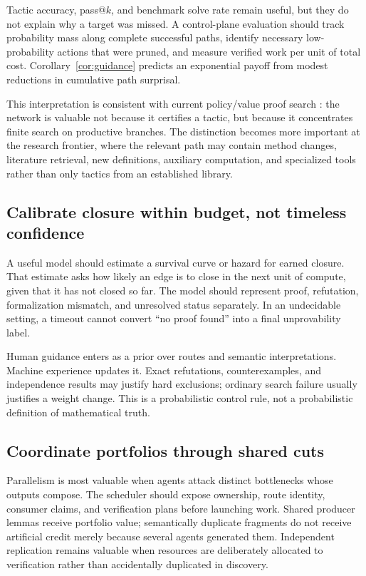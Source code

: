 \documentclass[11pt]{article}
\begin{document}
Tactic accuracy, pass@$k$, and benchmark solve rate remain useful, but they do
not explain why a target was missed.  A control-plane evaluation should track
probability mass along complete successful paths, identify necessary
low-probability actions that were pruned, and measure verified work per unit of
total cost.  Corollary~\ref{cor:guidance} predicts an exponential payoff from
modest reductions in cumulative path surprisal.

This interpretation is consistent with current policy/value proof search
\citep{hubert2025alphaproof,yang2023leandojo}: the network is valuable not
because it certifies a tactic, but because it concentrates finite search on
productive branches.  The distinction becomes more important at the research
frontier, where the relevant path may contain method changes, literature
retrieval, new definitions, auxiliary computation, and specialized tools
rather than only tactics from an established library.

\subsection{Calibrate closure within budget, not timeless confidence}

A useful model should estimate a survival curve or hazard for earned closure.
That estimate asks how likely an edge is to close in the next unit of compute,
given that it has not closed so far.  The model should represent proof,
refutation, formalization mismatch, and unresolved status separately.  In an
undecidable setting, a timeout cannot convert ``no proof found'' into a final
unprovability label.

Human guidance enters as a prior over routes and semantic interpretations.
Machine experience updates it.  Exact refutations, counterexamples, and
independence results may justify hard exclusions; ordinary search failure
usually justifies a weight change.  This is a probabilistic control rule, not a
probabilistic definition of mathematical truth.

\subsection{Coordinate portfolios through shared cuts}

Parallelism is most valuable when agents attack distinct bottlenecks whose
outputs compose.  The scheduler should expose ownership, route identity,
consumer claims, and verification plans before launching work.  Shared
producer lemmas receive portfolio value; semantically duplicate fragments do
not receive artificial credit merely because several agents generated them.
Independent replication remains valuable when resources are deliberately
allocated to verification rather than accidentally duplicated in discovery.
\end{document}
